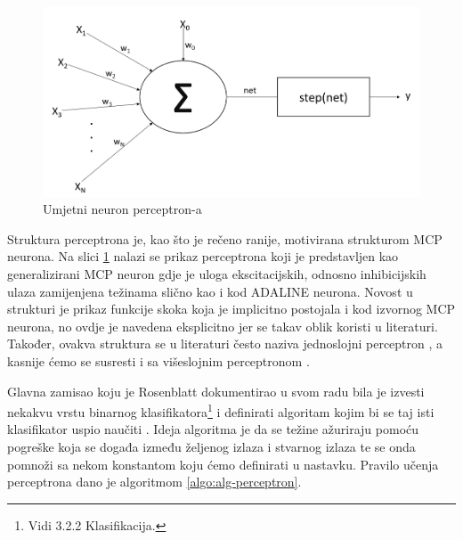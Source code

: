\documentclass[times, utf8, zavrsni]{fer}
\begin{document}
\begin{figure}[H]
    \centering
    \includegraphics[scale=0.5]{img/step-neuron.png}
    \caption[Caption for LOF]{Umjetni neuron perceptron-a\footnotemark}
    \label{fig:step-neuron}
\end{figure}

Struktura perceptrona je, kao što je rečeno ranije, motivirana strukturom MCP neurona. Na slici \ref{fig:step-neuron} nalazi se prikaz perceptrona koji je predstavljen kao generalizirani MCP neuron gdje je uloga ekscitacijskih, odnosno inhibicijskih ulaza zamijenjena težinama slično kao i kod ADALINE neurona. Novost u strukturi je prikaz funkcije skoka  koja je implicitno postojala i kod izvornog MCP neurona, no ovdje je navedena eksplicitno jer se takav oblik koristi u literaturi. Također, ovakva struktura se u literaturi često naziva jednoslojni perceptron , a kasnije ćemo se susresti i sa višeslojnim perceptronom .

Glavna zamisao koju je Rosenblatt dokumentirao u svom radu bila je izvesti nekakvu vrstu binarnog klasifikatora\footnote{Vidi 3.2.2 Klasifikacija.} i definirati algoritam kojim bi se taj isti klasifikator uspio naučiti \citep{rosenblatt}. Ideja algoritma je da se težine ažuriraju pomoću pogreške koja se događa između željenog izlaza i stvarnog izlaza te se onda pomnoži sa nekom konstantom koju ćemo definirati u nastavku. Pravilo učenja perceptrona dano je algoritmom \ref{algo:alg-perceptron}.
\end{document}
